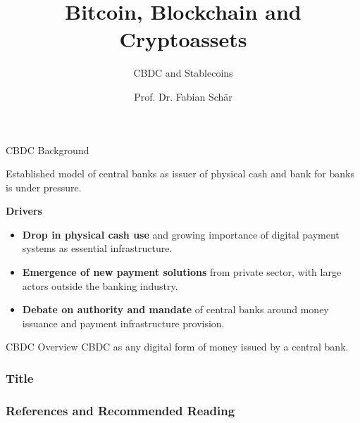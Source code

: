\documentclass[handout]{beamer}
\title{Bitcoin, Blockchain and Cryptoassets}
\subtitle{CBDC and Stablecoins}
\author{Prof. Dr. Fabian Schär}
\institute{University of Basel}
\begin{document}
\thispagestyle{empty}
\begin{frame}[noframenumbering]
	\titlepage
\end{frame}


\begin{frame}{CBDC Background}

Established model of central banks as issuer of physical cash and bank for banks is under pressure.
\vspace{1.5em}	

\textbf{Drivers}
\begin{itemize}
	\item \textbf{Drop in physical cash use} and growing importance of digital payment systems as essential infrastructure.
	\item \textbf{Emergence of new payment solutions} from private sector, with large actors outside the banking industry.
	\item \textbf{Debate on authority and mandate} of central banks around money issuance and payment infrastructure provision.
\end{itemize}

\end{frame}


\begin{frame}{CBDC Overview}
CBDC as any \color{focus} digital form of money issued by a central bank. \color{black} 

\begin{center}
	\begin{tikzpicture}[scale=0.4, every node/.style ={scale=0.8}]
		
	\end{tikzpicture}
\end{center}



\end{frame}

\begin{frame}
\frametitle{Title}

\end{frame}


\begin{frame}%
\frametitle{References and Recommended Reading}

	
	

\end{frame}
\end{document}
